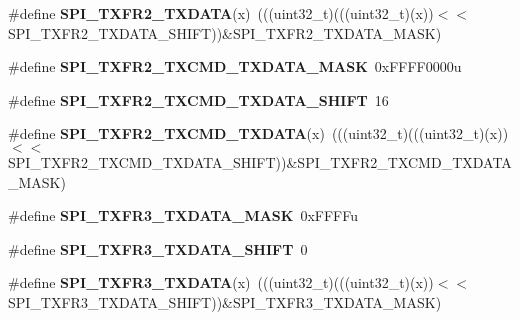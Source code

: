 \begin{DoxyCompactItemize}
\item 
\#define {\bfseries S\+P\+I\+\_\+\+T\+X\+F\+R2\+\_\+\+T\+X\+D\+A\+TA}(x)~(((uint32\+\_\+t)(((uint32\+\_\+t)(x))$<$$<$S\+P\+I\+\_\+\+T\+X\+F\+R2\+\_\+\+T\+X\+D\+A\+T\+A\+\_\+\+S\+H\+I\+FT))\&S\+P\+I\+\_\+\+T\+X\+F\+R2\+\_\+\+T\+X\+D\+A\+T\+A\+\_\+\+M\+A\+SK)\hypertarget{group__SPI__Register__Masks_ga250949668a77db2805371541e9bb8e16}{}\label{group__SPI__Register__Masks_ga250949668a77db2805371541e9bb8e16}

\item 
\#define {\bfseries S\+P\+I\+\_\+\+T\+X\+F\+R2\+\_\+\+T\+X\+C\+M\+D\+\_\+\+T\+X\+D\+A\+T\+A\+\_\+\+M\+A\+SK}~0x\+F\+F\+F\+F0000u\hypertarget{group__SPI__Register__Masks_ga7b74d7b06c2d79ce4f3f5171e63a66f6}{}\label{group__SPI__Register__Masks_ga7b74d7b06c2d79ce4f3f5171e63a66f6}

\item 
\#define {\bfseries S\+P\+I\+\_\+\+T\+X\+F\+R2\+\_\+\+T\+X\+C\+M\+D\+\_\+\+T\+X\+D\+A\+T\+A\+\_\+\+S\+H\+I\+FT}~16\hypertarget{group__SPI__Register__Masks_ga8093c55dfe44be309ef0286209361f0e}{}\label{group__SPI__Register__Masks_ga8093c55dfe44be309ef0286209361f0e}

\item 
\#define {\bfseries S\+P\+I\+\_\+\+T\+X\+F\+R2\+\_\+\+T\+X\+C\+M\+D\+\_\+\+T\+X\+D\+A\+TA}(x)~(((uint32\+\_\+t)(((uint32\+\_\+t)(x))$<$$<$S\+P\+I\+\_\+\+T\+X\+F\+R2\+\_\+\+T\+X\+C\+M\+D\+\_\+\+T\+X\+D\+A\+T\+A\+\_\+\+S\+H\+I\+FT))\&S\+P\+I\+\_\+\+T\+X\+F\+R2\+\_\+\+T\+X\+C\+M\+D\+\_\+\+T\+X\+D\+A\+T\+A\+\_\+\+M\+A\+SK)\hypertarget{group__SPI__Register__Masks_ga75b102ae2a2b880227933ea731c97323}{}\label{group__SPI__Register__Masks_ga75b102ae2a2b880227933ea731c97323}

\item 
\#define {\bfseries S\+P\+I\+\_\+\+T\+X\+F\+R3\+\_\+\+T\+X\+D\+A\+T\+A\+\_\+\+M\+A\+SK}~0x\+F\+F\+F\+Fu\hypertarget{group__SPI__Register__Masks_gac55f871f2a4bd1462049674e1b69d771}{}\label{group__SPI__Register__Masks_gac55f871f2a4bd1462049674e1b69d771}

\item 
\#define {\bfseries S\+P\+I\+\_\+\+T\+X\+F\+R3\+\_\+\+T\+X\+D\+A\+T\+A\+\_\+\+S\+H\+I\+FT}~0\hypertarget{group__SPI__Register__Masks_ga13d115127f0f26ef2f4afac9d4fcafd9}{}\label{group__SPI__Register__Masks_ga13d115127f0f26ef2f4afac9d4fcafd9}

\item 
\#define {\bfseries S\+P\+I\+\_\+\+T\+X\+F\+R3\+\_\+\+T\+X\+D\+A\+TA}(x)~(((uint32\+\_\+t)(((uint32\+\_\+t)(x))$<$$<$S\+P\+I\+\_\+\+T\+X\+F\+R3\+\_\+\+T\+X\+D\+A\+T\+A\+\_\+\+S\+H\+I\+FT))\&S\+P\+I\+\_\+\+T\+X\+F\+R3\+\_\+\+T\+X\+D\+A\+T\+A\+\_\+\+M\+A\+SK)\hypertarget{group__SPI__Register__Masks_ga49209a3863af39f655a385ddd5b917c4}{}\label{group__SPI__Register__Masks_ga49209a3863af39f655a385ddd5b917c4}


\end{DoxyCompactItemize}
